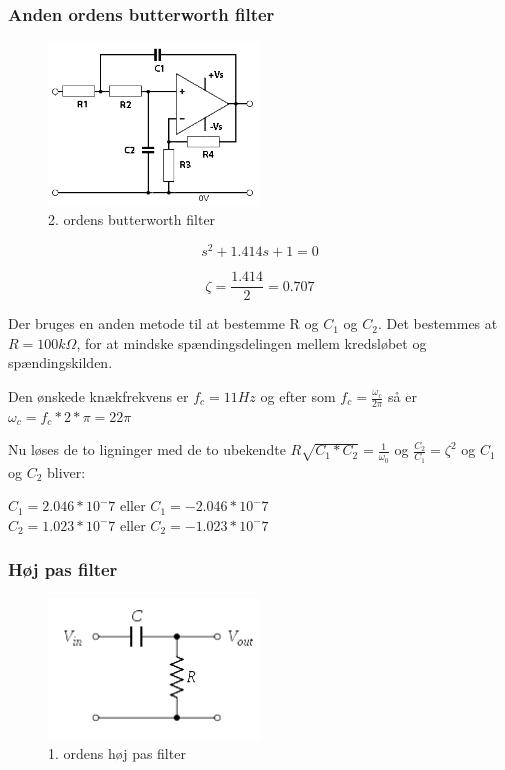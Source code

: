 \subsubsection{Anden ordens butterworth filter}
\begin{figure}[H]
	\centering
	\includegraphics[width = 0.5\textwidth]{billeder/2ordensButterworth.png}
	\caption{2. ordens butterworth filter}\label{fig:butterworth}
\end{figure}

\begin{equation}
	s^2 + 1.414s +1 = 0 
\end{equation}

\begin{equation}
	\zeta = \frac{1.414}{2} = 0.707
\end{equation}

Der bruges en anden metode til at bestemme R og $C_1$ og $C_2$. Det bestemmes at $R = 100k \Omega $, for at mindske spændingsdelingen mellem kredsløbet og spændingskilden.

Den ønskede knækfrekvens er $f_c = 11Hz$ og efter som $f_c = \frac{\omega_c}{2 \pi} $ så er $\omega_c = f_c * 2 * \pi = 22 \pi $

Nu løses de to ligninger med de to ubekendte $R \sqrt{C_1 * C_2} = \frac{1}{\omega_0}$ og $ \frac{C_2}{C_1} = \zeta^2$ og $C_1$ og $C_2$ bliver:

$C_1 = 2.046*10^-7$ eller $ C_1 = -2.046*10^-7$ \\
$C_2 = 1.023*10^-7$ eller $ C_2 = -1.023*10^-7$ \\

\subsubsection{Høj pas filter}
\begin{figure}[H]
	\centering
	\includegraphics[width = 0.5\textwidth]{billeder/HighPass.png}
	\caption{1. ordens høj pas filter}\label{fig:highpass}
\end{figure}

